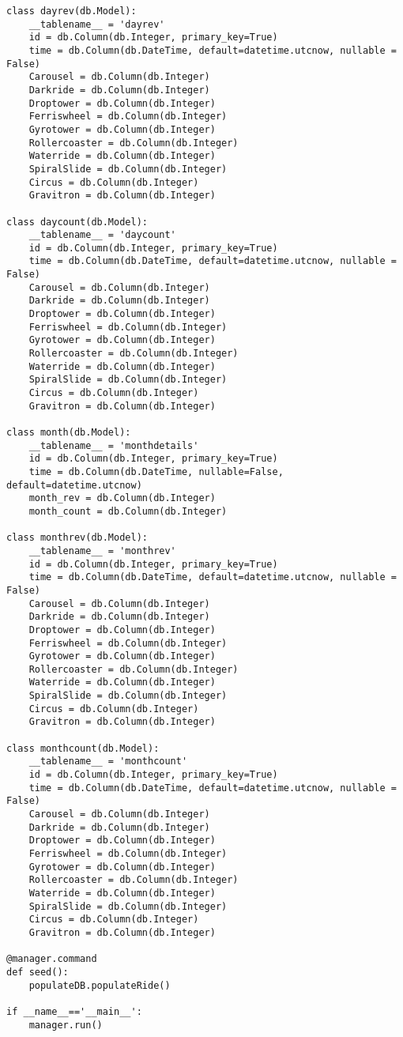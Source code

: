 \begin{lstlisting}
class dayrev(db.Model):
    __tablename__ = 'dayrev'
    id = db.Column(db.Integer, primary_key=True)
    time = db.Column(db.DateTime, default=datetime.utcnow, nullable = False)
    Carousel = db.Column(db.Integer)
    Darkride = db.Column(db.Integer)
    Droptower = db.Column(db.Integer)
    Ferriswheel = db.Column(db.Integer)
    Gyrotower = db.Column(db.Integer)
    Rollercoaster = db.Column(db.Integer)
    Waterride = db.Column(db.Integer)
    SpiralSlide = db.Column(db.Integer)
    Circus = db.Column(db.Integer)
    Gravitron = db.Column(db.Integer)

class daycount(db.Model):
    __tablename__ = 'daycount'
    id = db.Column(db.Integer, primary_key=True)
    time = db.Column(db.DateTime, default=datetime.utcnow, nullable = False)
    Carousel = db.Column(db.Integer)
    Darkride = db.Column(db.Integer)
    Droptower = db.Column(db.Integer)
    Ferriswheel = db.Column(db.Integer)
    Gyrotower = db.Column(db.Integer)
    Rollercoaster = db.Column(db.Integer)
    Waterride = db.Column(db.Integer)
    SpiralSlide = db.Column(db.Integer)
    Circus = db.Column(db.Integer)
    Gravitron = db.Column(db.Integer)

class month(db.Model):
    __tablename__ = 'monthdetails'
    id = db.Column(db.Integer, primary_key=True)
    time = db.Column(db.DateTime, nullable=False, default=datetime.utcnow)
    month_rev = db.Column(db.Integer)
    month_count = db.Column(db.Integer)

class monthrev(db.Model):
    __tablename__ = 'monthrev'
    id = db.Column(db.Integer, primary_key=True)
    time = db.Column(db.DateTime, default=datetime.utcnow, nullable = False)
    Carousel = db.Column(db.Integer)
    Darkride = db.Column(db.Integer)
    Droptower = db.Column(db.Integer)
    Ferriswheel = db.Column(db.Integer)
    Gyrotower = db.Column(db.Integer)
    Rollercoaster = db.Column(db.Integer)
    Waterride = db.Column(db.Integer)
    SpiralSlide = db.Column(db.Integer)
    Circus = db.Column(db.Integer)
    Gravitron = db.Column(db.Integer)

class monthcount(db.Model):
    __tablename__ = 'monthcount'
    id = db.Column(db.Integer, primary_key=True)
    time = db.Column(db.DateTime, default=datetime.utcnow, nullable = False)
    Carousel = db.Column(db.Integer)
    Darkride = db.Column(db.Integer)
    Droptower = db.Column(db.Integer)
    Ferriswheel = db.Column(db.Integer)
    Gyrotower = db.Column(db.Integer)
    Rollercoaster = db.Column(db.Integer)
    Waterride = db.Column(db.Integer)
    SpiralSlide = db.Column(db.Integer)
    Circus = db.Column(db.Integer)
    Gravitron = db.Column(db.Integer)

@manager.command
def seed():
    populateDB.populateRide()

if __name__=='__main__':
    manager.run()
\end{lstlisting}

